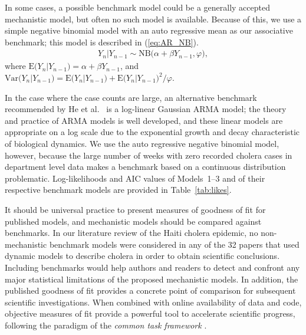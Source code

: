 \documentclass[10pt,letterpaper]{article}\usepackage[]{graphicx}\usepackage[table]{xcolor}
\newcommand\NBintercept{\alpha}
\newcommand\NBar{\beta}
\newcommand\NBsize{\varphi}
\newcommand\myeqref[1]{(\ref{#1})}
\newcommand\Var{\mathrm{Var}}
\begin{document}
In some cases, a possible benchmark model could be a generally accepted mechanistic model, but often no such model is available.
Because of this, we use a simple negative binomial model with an auto regressive mean as our associative benchmark; this model is described in \myeqref{eq:AR_NB}.
\begin{eqnarray}
\label{eq:AR_NB}
Y_n|Y_{n - 1} \sim \text{NB}\big(\NBintercept + \NBar Y_{n-1}, \NBsize \big),
\end{eqnarray}
where $\mathrm{E}\big(Y_n|Y_{n - 1}\big) = \NBintercept + \NBar Y_{n-1}$, and $\Var\big(Y_n|Y_{n - 1}\big) = \mathrm{E}\big(Y_n|Y_{n - 1}\big) + \mathrm{E}\big(Y_n|Y_{n - 1}\big)^2 / \NBsize$.
\new{\editSpatBench}

In the case where the case counts are large, an alternative benchmark recommended by He et al.~\cite{he10} is a log-linear Gaussian ARMA model;
the theory and practice of ARMA models is well developed, and these linear models are appropriate on a log scale due to the exponential growth and decay characteristic of biological dynamics.
We  use the auto regressive negative binomial model, however, because the large number of weeks with zero recorded cholera cases in department level data makes a benchmark based on a continuous distribution problematic.
Log-likelihoods and AIC values of Models~1--3 and of their respective  benchmark models are provided in Table~\ref{tab:likes}.


It should be universal practice to present measures of goodness of fit for published models, and mechanistic models should be compared against benchmarks.
In our literature review of the Haiti cholera epidemic, no non-mechanistic benchmark models were considered in any of the 32 papers that used dynamic models to describe cholera in order to obtain scientific conclusions.
Including benchmarks would help authors and readers to detect and confront any major statistical limitations of the proposed mechanistic models.
In addition, the published goodness of fit provides a concrete point of comparison for subsequent scientific investigations.
When combined with online availability of data and code, objective measures of fit provide a powerful tool to accelerate scientific progress, following the paradigm of the {\it common task framework} \cite{donoho17}. %
\end{document}
